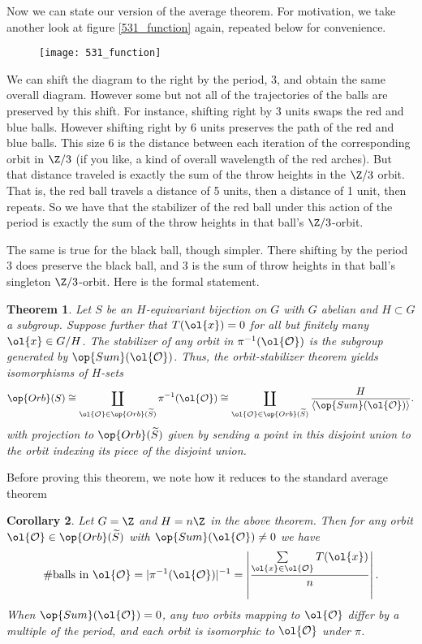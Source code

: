 \documentclass[12nt]{article}
\theoremstyle{plain}
\newtheorem{theorem}{Theorem}
\newtheorem{corollary}[theorem]{Corollary}
\begin{document}
Now we can state our version of the average theorem. For motivation, we take another look at figure \ref{531_function} again, repeated below for convenience.

\begin{figure}[ht]
\texttt{[image: 531\_function]}
\end{figure}

 We can shift the diagram to the right by the period, 3, and obtain the same overall diagram. However some but not all of the trajectories of the balls are preserved by this shift. For instance, shifting right by 3 units swaps the red and blue balls. However shifting right by 6 units preserves the path of the red and blue balls. This size 6 is the distance between each iteration of the corresponding orbit in $\Z/3$ (if you like, a kind of overall wavelength of the red arches). But that distance traveled is exactly the sum of the throw heights in the $\Z/3$ orbit. That is, the red ball travels a distance of 5 units, then a distance of 1 unit, then repeats. So we have that the stabilizer of the red ball under this action of the period is exactly the sum of the throw heights in that ball's $\Z/3$-orbit. 
 
 The same is true for the black ball, though simpler. There shifting by the period 3 does preserve the black ball, and 3 is the sum of throw heights in that ball's singleton $\Z/3$-orbit. Here is the formal statement.


\begin{theorem}
Let $S$ be an $H$-equivariant bijection on $G$ with $G$ abelian and $H \subset G$ a subgroup. Suppose further that $T(\ol{x}) = 0$ for all but finitely many $\ol{x} \in G/H$. The stabilizer of any orbit in $\pi^{-1}(\ol{\mathcal{O}})$ is the subgroup generated by $\op{Sum}(\ol{\mathcal{O}})$. Thus, the orbit-stabilizer theorem yields isomorphisms of $H$-sets
\[
\op{Orb}(S) \cong \coprod \limits_{\ol{\mathcal{O}} \in \op{Orb}(\widetilde{S})} \pi^{-1}(\ol{\mathcal{O}}) \cong \coprod \limits_{\ol{\mathcal{O}} \in \op{Orb}(\widetilde{S})} \frac{H}{\langle \op{Sum}(\ol{\mathcal{O}})\rangle }.
\]
with projection to $\op{Orb}(\widetilde{S})$ given by sending a point in this disjoint union to the orbit indexing its piece of the disjoint union.
\end{theorem}
Before proving this theorem, we note how it reduces to the standard average theorem
\begin{corollary}
Let $G = \Z$ and $H = n\Z$ in the above theorem. Then for any orbit $\ol{\mathcal{O}} \in \op{Orb}(\widetilde{S})$ with $\op{Sum}(\ol{\mathcal{O}}) \neq 0$ we have
\[
\# \text{balls in } \ol{\mathcal{O}} = |\pi^{-1}(\ol{\mathcal{O}})|^{-1} = \left| \frac{\sum \limits_{\ol{x} \in \ol{\mathcal{O}}} T(\ol{x})}{n} \right|.
\]
When $\op{Sum}(\ol{\mathcal{O}}) = 0$, any two orbits mapping to $\ol{\mathcal{O}}$ differ by a multiple of the period, and each orbit is isomorphic to $\ol{\mathcal{O}}$ under $\pi$.
\end{corollary}
\end{document}
